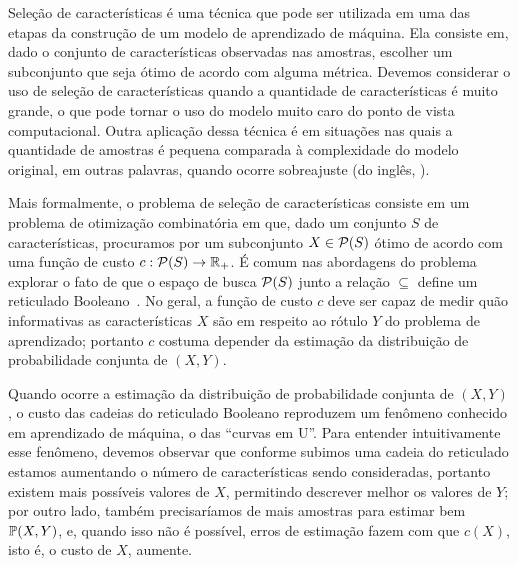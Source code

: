 
Seleção de características é uma técnica que pode ser utilizada em uma 
das etapas da construção de um modelo de aprendizado de máquina. Ela 
consiste em, dado o conjunto de características observadas nas amostras,
escolher um subconjunto que seja ótimo de acordo com alguma métrica. 
Devemos considerar o uso de seleção de características quando a 
quantidade de características é muito grande, o que pode tornar o uso do
modelo muito caro do ponto de vista computacional. Outra aplicação dessa 
técnica é em situações nas quais a quantidade de amostras é pequena 
comparada à complexidade do modelo original, em outras palavras, quando 
ocorre sobreajuste (do inglês, ).

Mais formalmente, o problema de seleção de características consiste em
um problema de otimização combinatória em que, dado um conjunto $S$ de 
características, procuramos por um subconjunto $X \in \mathcal{P} (S)$
ótimo de acordo com uma função de custo $c : \mathcal{P}(S) \to 
\mathbb{R}_{+}$. É comum nas abordagens do problema explorar o
fato de que o espaço de busca $\mathcal{P}(S)$ junto a relação $\subseteq$
define um reticulado Booleano~\cite{Rei12,AG+18}. No geral, a 
função de custo $c$ deve ser capaz de medir quão informativas as 
características $X$ são em respeito ao rótulo $Y$ do problema de 
aprendizado; portanto $c$ costuma depender da estimação da distribuição 
de probabilidade conjunta de $(X, Y)$.

Quando ocorre a estimação da distribuição de probabilidade conjunta de 
$(X, Y)$, o custo das cadeias do reticulado Booleano reproduzem um
fenômeno conhecido em aprendizado de máquina, o das ``curvas em U''. 
Para entender intuitivamente esse fenômeno, devemos observar que 
conforme subimos uma cadeia do reticulado estamos aumentando o número de
características sendo consideradas, portanto existem mais possíveis
valores de $X$, permitindo descrever melhor os valores de $Y$; por outro
lado, também precisaríamos de mais amostras para estimar bem 
$\mathbb{P} (X, Y)$, e, quando isso não é possível, erros de estimação
fazem com que $c(X)$, isto é, o custo de $X$, aumente.

